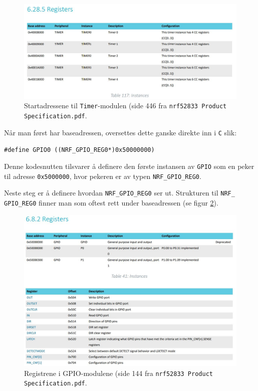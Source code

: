 \begin{figure}[ht]
    \centering
    \includegraphics[scale=0.61]{figures/timer_memory.JPG}
    \caption{Startadressene til \texttt{Timer}-modulen (side 446 fra \texttt{nrf52833 Product Specification.pdf}.}
    \label{fig:app-timerl}
\end{figure}

Når man først har baseadressen, oversettes dette ganske direkte inn i \verb|C| slik:

\verb|#define GPIO0 ((NRF_GPIO_REG0*)0x50000000)|

Denne kodesnutten tilsvarer å definere den første instansen av \verb|GPIO| som en peker til adresse \verb|0x5000000|, hvor pekeren er av typen \verb|NRF_GPIO_REG0|. 

Neste steg er å definere hvordan \verb|NRF_GPIO_REG0| ser ut. Strukturen til \verb|NRF_ GPIO_REG0| finner man som oftest rett under baseadressen (se figur \ref{fig:app-memory-struct}).

\begin{figure}[ht]
    \centering
    \includegraphics[scale=0.61]{figures/memory_stuff_gpio.JPG}
    \caption{Registrene i GPIO-modulene (side 144 fra \texttt{nrf52833 Product Specification.pdf}.}
    \label{fig:app-memory-struct}
\end{figure}

